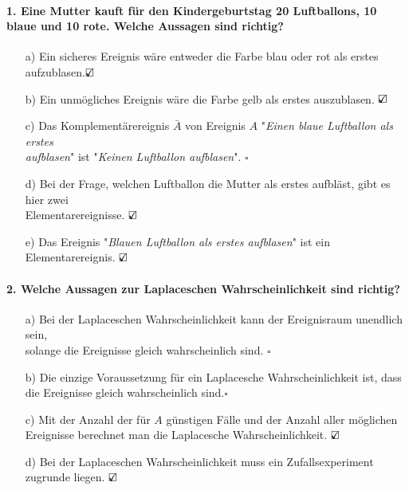 \documentclass[a4paper]{article}
\begin{document}
\paragraph{1. Eine Mutter kauft für den Kindergeburtstag 20 Luftballons, 10 blaue und 10 rote. Welche Aussagen sind richtig?}
\begin{itemize}
    \item[a)] Ein sicheres Ereignis wäre entweder die Farbe blau oder rot als erstes aufzublasen.\hfill $\text{\rlap{$\checkmark$}}\square$
    \item[b)] Ein unmögliches Ereignis wäre die Farbe gelb als erstes auszublasen. \hfill $\text{\rlap{$\checkmark$}}\square$
    \item[c)] Das Komplementärereignis $\bar A$ von Ereignis $A$ "\textit{Einen blaue Luftballon als erstes \\aufblasen}" ist "\textit{Keinen Luftballon aufblasen}". \hfill  $\square$
    \item[d)] Bei der Frage, welchen Luftballon die Mutter als erstes aufbläst, gibt es hier zwei\\ Elementarereignisse. \hfill $\text{\rlap{$\checkmark$}}\square$
    \item[e)] Das Ereignis "\textit{Blauen Luftballon als erstes aufblasen}" ist ein Elementarereignis. \hfill $\text{\rlap{$\checkmark$}}\square$
\end{itemize}

\paragraph{2. Welche Aussagen zur Laplaceschen Wahrscheinlichkeit sind richtig?}
\begin{itemize}
    \item [a)] Bei der Laplaceschen Wahrscheinlichkeit kann der Ereignisraum unendlich sein,\\ solange die Ereignisse gleich wahrscheinlich sind. \hfill $\square$
    \item[b)] Die einzige Voraussetzung für ein Laplacesche Wahrscheinlichkeit ist, dass \\die Ereignisse gleich wahrscheinlich sind.\hfill $\square$
    \item[c)] Mit der Anzahl der für $A$ günstigen Fälle und der Anzahl aller möglichen\\ Ereignisse berechnet man die Laplacesche Wahrscheinlichkeit. \hfill $\text{\rlap{$\checkmark$}}\square$
    \item[d)] Bei der Laplaceschen Wahrscheinlichkeit muss ein Zufallsexperiment zugrunde liegen. \hfill $\text{\rlap{$\checkmark$}}\square$
\end{itemize}
\end{document}
